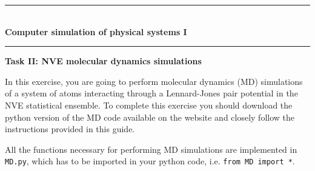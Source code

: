 \documentclass[12pt]{article}
\begin{document}
\begin{center}
\rule[2mm]{13.5cm}{.1pt} \\
{\Large {\bf Computer simulation of physical systems I}}\\
\rule[2mm]{13.5cm}{.1pt}
\end{center}
\vspace{-1cm}
\begin{center}
{\bf Task II: NVE molecular dynamics simulations} \\
\end{center}

In this exercise, you are going to perform molecular dynamics (MD) simulations
of a system of atoms interacting through a Lennard-Jones pair potential in the
NVE statistical ensemble. To complete this exercise you should download the
python version of the MD code available on the website and closely follow the
instructions provided in this guide. 

All the functions necessary for performing MD simulations are implemented in
\verb!MD.py!, which has to be imported in your python code, i.e.
\verb!from MD import *!.
\end{document}
